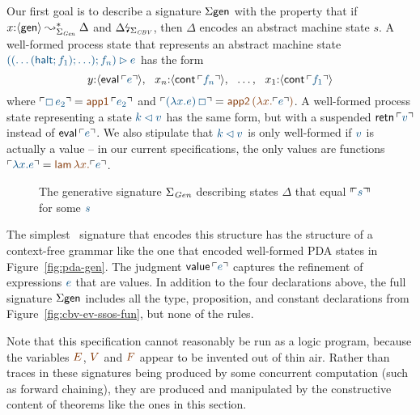 
Our first goal is to describe a signature $\Sigma\sf gen$ with the
property that if $x{:}\langle {\sf gen} \rangle \leadsto^*_{\Sigma_{\it Gen}}
\Delta$ and ${\Delta}{\mbox{\lightning}}_{\Sigma_{\it CBV}}$, then $\Delta$ encodes
an abstract machine state
$s$. A well-formed process state that represents an abstract machine
state $\obj{((\ldots({\sf halt}; f_1); \ldots); f_n) \rhd e}$ has the form
\[
y{:}\susp{{\sf eval}\,\interp{e}}, ~~
x_n{:}\susp{{\sf cont}\,\interp{f_n}}, ~~
\ldots, ~~
x_1{:}\susp{{\sf cont}\,\interp{f_1}}
\]
where $\interp{\Box\,e_2} = \lf{{\sf app1}\,\interp{e_2}}$ and
$\interp{(\lambda x.e)\,\Box} = \lf{{\sf app2}\,(\lambda x.\interp{e})}$. 
A well-formed process state representing a state $\obj{k \lhd v}$ has 
the same form, but with a suspended ${\sf retn}\,\interp{v}$ instead
of ${\sf eval}\,\interp{e}$. We also stipulate that 
$\obj{k \lhd v}$ is only well-formed if $\obj{v}$ is actually a value
-- in our current specifications, the only values are functions
$\interp{\lambda x.e} = \lf{{\sf lam}\,\lambda x. \interp{e}}$.

\begin{figure}
\caption{The generative signature $\Sigma_{\it Gen}$ 
 describing states $\Delta$ that equal $\ctxinterp{s}$ for some $\obj{s}$}
\label{fig:cbv-ev-ssos-gen}
\end{figure}

The simplest \sls~signature that encodes this structure has the
structure of a context-free grammar like the one that encoded
well-formed PDA states in Figure~\ref{fig:pda-gen}. The judgment ${\sf
  value}\,\interp{e}$ captures the refinement of expressions $\obj{e}$
that are values. In addition to the four declarations above, the full
signature $\Sigma\sf gen$ includes all the type, proposition, and
constant declarations from Figure~\ref{fig:cbv-ev-ssos-fun}, but none
of the rules.

Note that this specification cannot reasonably be run as a logic
program, because the variables $\lf{E}$, $\lf{V}$ and $\lf{F}$ appear
to be invented out of thin air.  Rather than traces in these
signatures being produced by some concurrent computation (such as
forward chaining), they are produced and manipulated by the
constructive content of theorems like the ones in this section.

